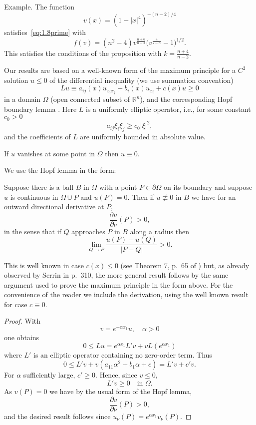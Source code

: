 Example. The function
\[v(x) = (1+|x|^4)^{-(n-2)/4}\]
satisfies~\eqref{eq:1.8prime} with
\[f(v) = (n^2-4) v^{\frac{n+6}{n-2}} \biggl(v^{\frac{4}{2-n}}-1\biggr)^{1/2}.\]
This satisfies the conditions of the proposition with $k = \frac{n+4}{n-2}$.

Our results are based on a well-known form of the maximum principle \cite{protter_maximum_1984} for
a $C^2$ solution $u\leq 0$ of the differential inequality (we use summation convention)
\begin{equation}\label{eq:1.10}
  Lu\equiv a_{ij}(x)u_{x_ix_j} + b_i(x)u_{x_i} + c(x)u \geq 0
\end{equation}
in a domain $\Omega$ (open connected subset of $\mathbb{R}^n$),
and the corresponding Hopf boundary lemma \cite{protter_maximum_1984}. 
Here $L$ is a uniformly elliptic operator, i.e., for some constant $c_0>0$
\begin{equation}\label{eq:1.11}
  a_{ij}\xi_i\xi_j \geq c_0|\xi|^2,
\end{equation}
and the coefficients of $L$ are uniformly bounded in absolute value.

\begin{MP}
If $u$ vanishes at some point in $\Omega$ then $u\equiv 0$.
\end{MP}

We use the Hopf lemma in the form:

\begin{lemmaH}
  Suppose there is a ball $B$ in $\Omega$ with a point $P\in\partial\Omega$
  on its boundary and suppose $u$ is continuous in $\Omega\cup P$ and $u(P)=0$.
  Then if $u\not\equiv 0$ in $B$ we have for an outward directional derivative at $P$,
  \[\frac{\partial u}{\partial \nu}(P) > 0,\]
  in the sense that if $Q$ approaches $P$ in $B$ along a radius then
  \[\lim_{Q\to P} \frac{u(P)-u(Q)}{|P-Q|} > 0.\]
\end{lemmaH}

This is well known in case $c(x)\leq 0$ (see Theorem 7, p.~65 of \cite{protter_maximum_1984}) but,
as already observed by Serrin in \cite{serrin_symmetry_1971} p.~310, the more general result follows by the same
argument used to prove the maximum principle in the form above.
For the convenience of the reader we include the derivation, using the well known
result for case $c\equiv 0$.

\begin{proof}
  With
  \[v = e^{-\alpha x_1} u, \quad \alpha>0\]
  one obtains
  \[0\leq Lu = e^{\alpha x_1} L'v + vL(e^{\alpha x_1})\]
  where $L'$ is an elliptic operator containing no zero-order term. Thus
  \[0\leq L'v + v(a_{11}\alpha^2 + b_1\alpha +c) = L'v + c'v.\]
  For $\alpha$ sufficiently large, $c'\geq 0$. Hence, since $v\leq 0$,
  \[L'v \geq 0\quad \text{in } \Omega.\]
  As $v(P)=0$ we have by the usual form of the Hopf lemma,
  \[\frac{\partial v}{\partial \nu}(P)>0,\]
  and the desired result follows since $u_{\nu}(P) = e^{\alpha x_1} v_{\nu}(P)$.
\end{proof}

